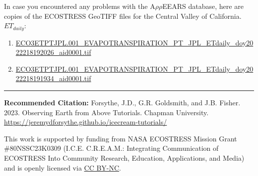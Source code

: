 \documentclass[oneside,a4paper,11pt,explicit]{book}
\begin{document}
\begin{tcolorbox}[colback=yellow!5!white,title=\textbf{Datafiles}]
	\large
	In case you encountered any problems with the A$\rho\rho$EEARS database, here are copies of the ECOSTRESS GeoTIFF files for the Central Valley of California. $ET_{daily}$:
	\begin{enumerate}
		\item \href{https://jeremydforsythe.github.io/icecream-tutorials/Tutorial8_Evaportranspiration/ECO3ETPTJPL.001_EVAPOTRANSPIRATION_PT_JPL_ETdaily_doy2022218192026_aid0001.tif}{\small ECO3ETPTJPL.001\_EVAPOTRANSPIRATION\_PT\_JPL\_ETdaily\_doy2022218192026\_aid0001.tif}
		\item \href{https://jeremydforsythe.github.io/icecream-tutorials/Tutorial8_Evaportranspiration/ECO3ETPTJPL.001_EVAPOTRANSPIRATION_PT_JPL_ETdaily_doy2022218191934_aid0001.tif}{\small ECO3ETPTJPL.001\_EVAPOTRANSPIRATION\_PT\_JPL\_ETdaily\_doy2022218191934\_aid0001.tif}
	\end{enumerate}
\end{tcolorbox}

\vfill

\hrule

\vspace{1em}

\small \textbf{Recommended Citation:} Forsythe, J.D., G.R. Goldsmith, and J.B. Fisher. 2023. Observing Earth from Above Tutorials. Chapman University. \url{https://jeremydforsythe.github.io/icecream-tutorials/}

\vspace{1em}

This work is supported by funding from NASA ECOSTRESS Mission Grant \#80NSSC23K0309 (I.C.E. C.R.E.A.M.: Integrating Communication of ECOSTRESS Into Community Research, Education, Applications, and Media) and is openly licensed via \href{https://creativecommons.org/licenses/by-nc/4.0/}{CC BY-NC}.
\end{document}
